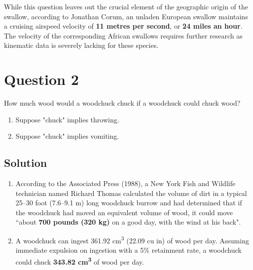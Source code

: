 \documentclass[
  UTF8, %
  12pt, %
]{assigment}
\begin{document}
While this question leaves out the crucial element of the geographic origin of the swallow, according to Jonathan Corum, an unladen European swallow maintains a cruising airspeed velocity of \textbf{11 metres per second}, or \textbf{24 miles an hour}. The velocity of the corresponding African swallows requires further research as kinematic data is severely lacking for these species.


\section*{Question 2}

\begin{problem}
How much wood would a woodchuck chuck if a woodchuck could chuck wood?

\medskip

\begin{enumerate}[label=(\emph{\alph*}), ref=\alph*] %
  \item Suppose "chuck" implies throwing.
  \item Suppose "chuck" implies vomiting.
\end{enumerate}
\end{problem}


\subsection*{Solution}

\begin{enumerate}[label=(\emph{\alph*}), ref=\alph*] %
  \item According to the Associated Press (1988), a New York Fish and Wildlife technician named Richard Thomas calculated the volume of dirt in a typical 25--30 foot (7.6--9.1 m) long woodchuck burrow and had determined that if the woodchuck had moved an equivalent volume of wood, it could move ``about \textbf{700 pounds (320 kg)} on a good day, with the wind at his back".

  \item A woodchuck can ingest 361.92 cm\textsuperscript{3} (22.09 cu in) of wood per day. Assuming immediate expulsion on ingestion with a 5\% retainment rate, a woodchuck could chuck \textbf{343.82 cm\textsuperscript{3}} of wood per day.
\end{enumerate}
\end{document}
